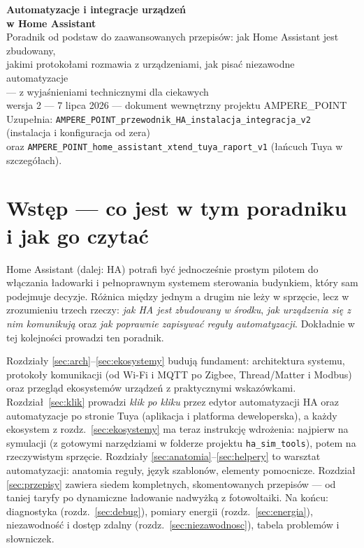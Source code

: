\documentclass[11pt,a4paper]{article}
\begin{document}
\begin{center}
{\huge\bfseries\sffamily\color{navy} Automatyzacje i integracje urządzeń\\[2pt] w Home Assistant}\\[8pt]
{\large Poradnik od podstaw do zaawansowanych przepisów: jak Home Assistant jest zbudowany,\\ jakimi protokołami rozmawia z urządzeniami, jak pisać niezawodne automatyzacje\\[2pt] --- z wyjaśnieniami technicznymi dla ciekawych}\\[6pt]
{\normalsize wersja 2 --- 7 lipca 2026 --- dokument wewnętrzny projektu AMPERE\_POINT}\\[2pt]
{\small Uzupełnia: \texttt{AMPERE\_POINT\_przewodnik\_HA\_instalacja\_integracja\_v2} (instalacja i konfiguracja od zera)\\ oraz \texttt{AMPERE\_POINT\_home\_assistant\_xtend\_tuya\_raport\_v1} (łańcuch Tuya w szczegółach).}
\end{center}

\vspace{4pt}
\tableofcontents
\newpage

\section{Wstęp --- co jest w tym poradniku i jak go czytać}

Home Assistant (dalej: HA) potrafi być jednocześnie prostym pilotem do włączania ładowarki i pełnoprawnym systemem sterowania budynkiem, który sam podejmuje decyzje. Różnica między jednym a drugim nie leży w sprzęcie, lecz w zrozumieniu trzech rzeczy: \emph{jak HA jest zbudowany w środku}, \emph{jak urządzenia się z nim komunikują} oraz \emph{jak poprawnie zapisywać reguły automatyzacji}. Dokładnie w tej kolejności prowadzi ten poradnik.

Rozdziały \ref{sec:arch}--\ref{sec:ekosystemy} budują fundament: architektura systemu, protokoły komunikacji (od Wi-Fi i MQTT po Zigbee, Thread/Matter i Modbus) oraz przegląd ekosystemów urządzeń z praktycznymi wskazówkami. Rozdział~\ref{sec:klik} prowadzi \emph{klik po kliku} przez edytor automatyzacji HA oraz automatyzacje po stronie Tuya (aplikacja i platforma deweloperska), a każdy ekosystem z rozdz.~\ref{sec:ekosystemy} ma teraz instrukcję wdrożenia: najpierw na symulacji (z gotowymi narzędziami w folderze projektu \texttt{ha\_sim\_tools}), potem na rzeczywistym sprzęcie. Rozdziały \ref{sec:anatomia}--\ref{sec:helpery} to warsztat automatyzacji: anatomia reguły, język szablonów, elementy pomocnicze. Rozdział \ref{sec:przepisy} zawiera siedem kompletnych, skomentowanych przepisów --- od taniej taryfy po dynamiczne ładowanie nadwyżką z fotowoltaiki. Na końcu: diagnostyka (rozdz.~\ref{sec:debug}), pomiary energii (rozdz.~\ref{sec:energia}), niezawodność i dostęp zdalny (rozdz.~\ref{sec:niezawodnosc}), tabela problemów i słowniczek.
\end{document}
